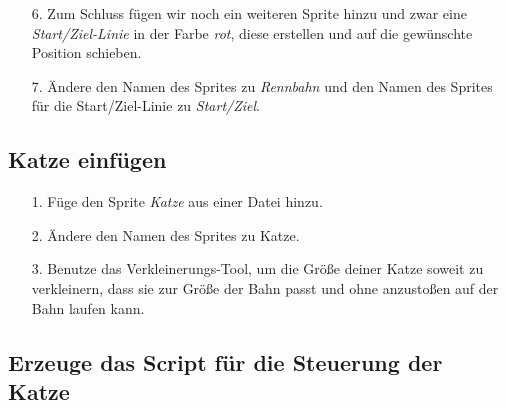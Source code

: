 \begin{itemize}
\item[6. ] Zum Schluss fügen wir noch ein weiteren Sprite hinzu und zwar eine \emph{Start/Ziel-Linie} in der Farbe \emph{rot}, diese erstellen und auf die gewünschte Position schieben.
\end{itemize}

\begin{itemize}
\item[7.] Ändere den Namen des Sprites zu \textit{Rennbahn} und den Namen des Sprites für die Start/Ziel-Linie zu \textit{Start/Ziel}.
\end{itemize}

\subsection{Katze einfügen}

\begin{itemize}
\item[1.] Füge den Sprite \emph{Katze} aus einer Datei hinzu.
\end{itemize}

\begin{itemize}
\item[2. ] Ändere den Namen des Sprites zu Katze.
\end{itemize}
\begin{itemize}
\item[3.] Benutze das Verkleinerungs-Tool, um die Größe deiner Katze soweit zu verkleinern, dass sie zur Größe der Bahn passt und ohne anzustoßen auf der Bahn laufen kann.
\end{itemize}


\subsection{Erzeuge das Script für die Steuerung der Katze}

